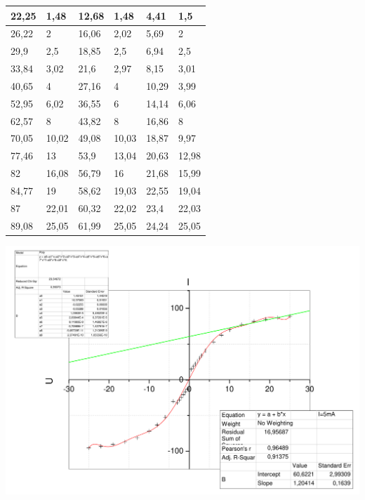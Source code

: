 \documentclass[a4paper,12pt]{article}
\begin{document}
\begin{table}[h]
\begin{tabular}{|l|l|l|l|l|l|}
				22,25      & 1,48      & 12,68     & 1,48      & 4,41      & 1,5       \\ \hline
				26,22      & 2         & 16,06     & 2,02      & 5,69      & 2         \\ \hline
				29,9       & 2,5       & 18,85     & 2,5       & 6,94      & 2,5       \\ \hline
				33,84      & 3,02      & 21,6      & 2,97      & 8,15      & 3,01      \\ \hline
				40,65      & 4         & 27,16     & 4         & 10,29     & 3,99      \\ \hline
				52,95      & 6,02      & 36,55     & 6         & 14,14     & 6,06      \\ \hline
				62,57      & 8         & 43,82     & 8         & 16,86     & 8         \\ \hline
				70,05      & 10,02     & 49,08     & 10,03     & 18,87     & 9,97      \\ \hline
				77,46      & 13        & 53,9      & 13,04     & 20,63     & 12,98     \\ \hline
				82         & 16,08     & 56,79     & 16        & 21,68     & 15,99     \\ \hline
				84,77      & 19        & 58,62     & 19,03     & 22,55     & 19,04     \\ \hline
				87         & 22,01     & 60,32     & 22,02     & 23,4      & 22,03     \\ \hline
				89,08      & 25,05     & 61,99     & 25,05     & 24,24     & 25,05     \\ \hline
			\end{tabular}
		\end{table}
		
		\includegraphics[width = \linewidth]{5mA}
		
\end{document}
